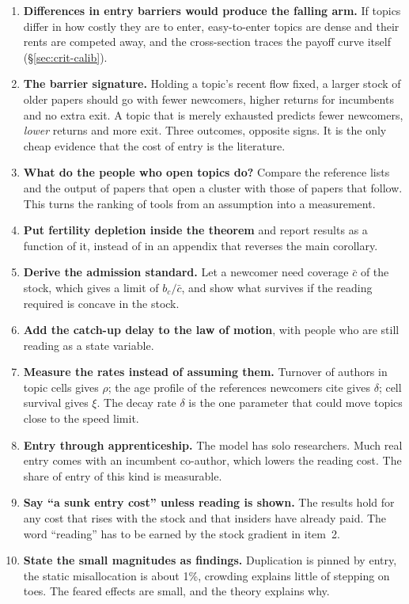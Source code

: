 \begin{enumerate}
\item \textbf{Differences in entry barriers would produce the falling arm.} If topics differ in how costly they are to enter, easy-to-enter topics are dense and their rents are competed away, and the cross-section traces the payoff curve itself (\S\ref{sec:crit-calib}).
\item \textbf{The barrier signature.} Holding a topic's recent flow fixed, a larger stock of older papers should go with fewer newcomers, higher returns for incumbents and no extra exit. A topic that is merely exhausted predicts fewer newcomers, \emph{lower} returns and more exit. Three outcomes, opposite signs. It is the only cheap evidence that the cost of entry is the literature.
\item \textbf{What do the people who open topics do?} Compare the reference lists and the output of papers that open a cluster with those of papers that follow. This turns the ranking of tools from an assumption into a measurement.
\item \textbf{Put fertility depletion inside the theorem} and report results as a function of it, instead of in an appendix that reverses the main corollary.
\item \textbf{Derive the admission standard.} Let a newcomer need coverage $\bar c$ of the stock, which gives a limit of $b_c/\bar c$, and show what survives if the reading required is concave in the stock.
\item \textbf{Add the catch-up delay to the law of motion}, with people who are still reading as a state variable.
\item \textbf{Measure the rates instead of assuming them.} Turnover of authors in topic cells gives $\rho$; the age profile of the references newcomers cite gives $\delta$; cell survival gives $\xi$. The decay rate $\delta$ is the one parameter that could move topics close to the speed limit.
\item \textbf{Entry through apprenticeship.} The model has solo researchers. Much real entry comes with an incumbent co-author, which lowers the reading cost. The share of entry of this kind is measurable.
\item \textbf{Say ``a sunk entry cost'' unless reading is shown.} The results hold for any cost that rises with the stock and that insiders have already paid. The word ``reading'' has to be earned by the stock gradient in item~2.
\item \textbf{State the small magnitudes as findings.} Duplication is pinned by entry, the static misallocation is about 1\%, crowding explains little of stepping on toes. The feared effects are small, and the theory explains why.

\end{enumerate}

